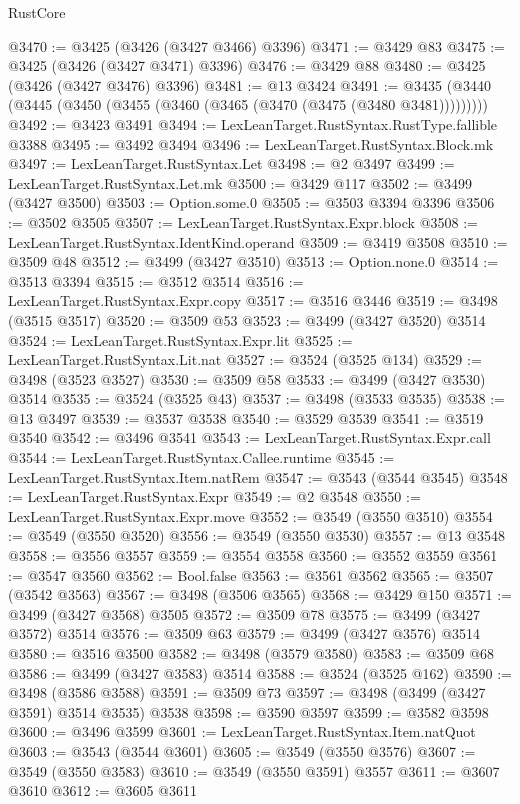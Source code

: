 \begin{lexlean}{RustCore}
\begin{coremodule}
@3470 := @3425 (@3426 (@3427 @3466) @3396)
@3471 := @3429 @83
@3475 := @3425 (@3426 (@3427 @3471) @3396)
@3476 := @3429 @88
@3480 := @3425 (@3426 (@3427 @3476) @3396)
@3481 := @13 @3424
@3491 := @3435 (@3440 (@3445 (@3450 (@3455 (@3460 (@3465 (@3470 (@3475 (@3480 @3481)))))))))
@3492 := @3423 @3491
@3494 := LexLeanTarget.RustSyntax.RustType.fallible @3388
@3495 := @3492 @3494
@3496 := LexLeanTarget.RustSyntax.Block.mk
@3497 := LexLeanTarget.RustSyntax.Let
@3498 := @2 @3497
@3499 := LexLeanTarget.RustSyntax.Let.mk
@3500 := @3429 @117
@3502 := @3499 (@3427 @3500)
@3503 := Option.some.{0}
@3505 := @3503 @3394 @3396
@3506 := @3502 @3505
@3507 := LexLeanTarget.RustSyntax.Expr.block
@3508 := LexLeanTarget.RustSyntax.IdentKind.operand
@3509 := @3419 @3508
@3510 := @3509 @48
@3512 := @3499 (@3427 @3510)
@3513 := Option.none.{0}
@3514 := @3513 @3394
@3515 := @3512 @3514
@3516 := LexLeanTarget.RustSyntax.Expr.copy
@3517 := @3516 @3446
@3519 := @3498 (@3515 @3517)
@3520 := @3509 @53
@3523 := @3499 (@3427 @3520) @3514
@3524 := LexLeanTarget.RustSyntax.Expr.lit
@3525 := LexLeanTarget.RustSyntax.Lit.nat
@3527 := @3524 (@3525 @134)
@3529 := @3498 (@3523 @3527)
@3530 := @3509 @58
@3533 := @3499 (@3427 @3530) @3514
@3535 := @3524 (@3525 @43)
@3537 := @3498 (@3533 @3535)
@3538 := @13 @3497
@3539 := @3537 @3538
@3540 := @3529 @3539
@3541 := @3519 @3540
@3542 := @3496 @3541
@3543 := LexLeanTarget.RustSyntax.Expr.call
@3544 := LexLeanTarget.RustSyntax.Callee.runtime
@3545 := LexLeanTarget.RustSyntax.Item.natRem
@3547 := @3543 (@3544 @3545)
@3548 := LexLeanTarget.RustSyntax.Expr
@3549 := @2 @3548
@3550 := LexLeanTarget.RustSyntax.Expr.move
@3552 := @3549 (@3550 @3510)
@3554 := @3549 (@3550 @3520)
@3556 := @3549 (@3550 @3530)
@3557 := @13 @3548
@3558 := @3556 @3557
@3559 := @3554 @3558
@3560 := @3552 @3559
@3561 := @3547 @3560
@3562 := Bool.false
@3563 := @3561 @3562
@3565 := @3507 (@3542 @3563)
@3567 := @3498 (@3506 @3565)
@3568 := @3429 @150
@3571 := @3499 (@3427 @3568) @3505
@3572 := @3509 @78
@3575 := @3499 (@3427 @3572) @3514
@3576 := @3509 @63
@3579 := @3499 (@3427 @3576) @3514
@3580 := @3516 @3500
@3582 := @3498 (@3579 @3580)
@3583 := @3509 @68
@3586 := @3499 (@3427 @3583) @3514
@3588 := @3524 (@3525 @162)
@3590 := @3498 (@3586 @3588)
@3591 := @3509 @73
@3597 := @3498 (@3499 (@3427 @3591) @3514 @3535) @3538
@3598 := @3590 @3597
@3599 := @3582 @3598
@3600 := @3496 @3599
@3601 := LexLeanTarget.RustSyntax.Item.natQuot
@3603 := @3543 (@3544 @3601)
@3605 := @3549 (@3550 @3576)
@3607 := @3549 (@3550 @3583)
@3610 := @3549 (@3550 @3591) @3557
@3611 := @3607 @3610
@3612 := @3605 @3611

\end{coremodule}
\end{lexlean}
